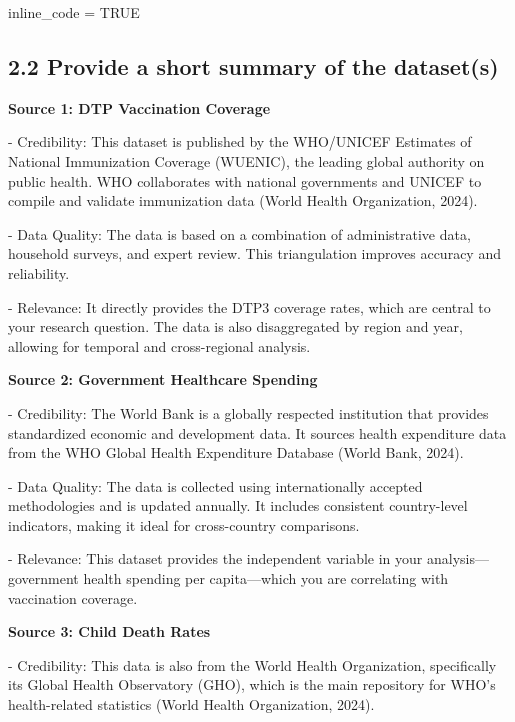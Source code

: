 \documentclass[
]{article}
\newenvironment{Shaded}{\begin{snugshade}}{\end{snugshade}}
\newcommand{\ConstantTok}[1]{\textcolor[rgb]{0.56,0.35,0.01}{#1}}
\newcommand{\NormalTok}[1]{#1}
\newcommand{\OtherTok}[1]{\textcolor[rgb]{0.56,0.35,0.01}{#1}}
\begin{document}
\begin{Shaded}
\begin{Highlighting}[]
\NormalTok{inline\_code }\OtherTok{=} \ConstantTok{TRUE}
\end{Highlighting}
\end{Shaded}

\subsection{2.2 Provide a short summary of the
dataset(s)}\label{provide-a-short-summary-of-the-datasets}

\textbf{Source 1: DTP Vaccination Coverage}

- Credibility: This dataset is published by the WHO/UNICEF Estimates of
National Immunization Coverage (WUENIC), the leading global authority on
public health. WHO collaborates with national governments and UNICEF to
compile and validate immunization data (World Health Organization,
2024).

- Data Quality: The data is based on a combination of administrative
data, household surveys, and expert review. This triangulation improves
accuracy and reliability.

- Relevance: It directly provides the DTP3 coverage rates, which are
central to your research question. The data is also disaggregated by
region and year, allowing for temporal and cross-regional analysis.

\textbf{Source 2: Government Healthcare Spending}

- Credibility: The World Bank is a globally respected institution that
provides standardized economic and development data. It sources health
expenditure data from the WHO Global Health Expenditure Database (World
Bank, 2024).

- Data Quality: The data is collected using internationally accepted
methodologies and is updated annually. It includes consistent
country-level indicators, making it ideal for cross-country comparisons.

- Relevance: This dataset provides the independent variable in your
analysis---government health spending per capita---which you are
correlating with vaccination coverage.

\textbf{Source 3: Child Death Rates}

- Credibility: This data is also from the World Health Organization,
specifically its Global Health Observatory (GHO), which is the main
repository for WHO's health-related statistics (World Health
Organization, 2024).
\end{document}
